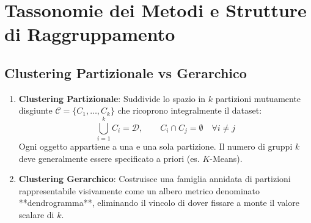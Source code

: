 \section{Tassonomie dei Metodi e Strutture di Raggruppamento}
\label{sec:dm-clustering-taxonomies}

\subsection{Clustering Partizionale vs Gerarchico}
\begin{enumerate}
    \item \textbf{Clustering Partizionale}: Suddivide lo spazio in $k$ partizioni mutuamente disgiunte $\mathcal{C} = \{C_1, \dots, C_k\}$ che ricoprono integralmente il dataset:
    \begin{equation}
        \bigcup_{i=1}^k C_i = \mathcal{D}, \qquad C_i \cap C_j = \emptyset \quad \forall i \neq j
    \end{equation}
    Ogni oggetto appartiene a una e una sola partizione. Il numero di gruppi $k$ deve generalmente essere specificato a priori (es. $K$-Means).
    \item \textbf{Clustering Gerarchico}: Costruisce una famiglia annidata di partizioni rappresentabile visivamente come un albero metrico denominato **dendrogramma**, eliminando il vincolo di dover fissare a monte il valore scalare di $k$.
\end{enumerate}


